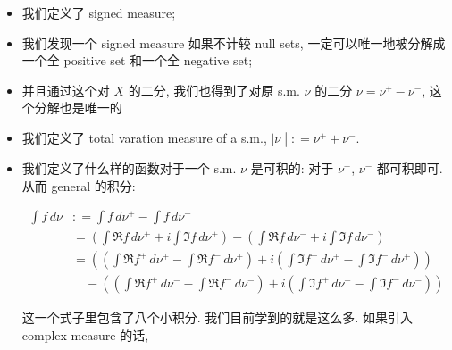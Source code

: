 \documentclass{qlnotes-export}
\begin{document}
\begin{itemize}
\item
  我们定义了 signed measure;
\item
  我们发现一个 signed measure 如果不计较 null sets, 一定可以唯一地被分解成一个全 positive set 和一个全 negative set;
\item
  并且通过这个对 \(X\) 的二分, 我们也得到了对原 s.m. \(\nu\) 的二分 \(\nu = \nu^{+} - \nu^{-}\), 这个分解也是唯一的
\item
  我们定义了 total varation measure of a s.m., \(\left. |\nu \middle| : = \nu^{+} + \nu^{-} \right.\).
\item
  我们定义了什么样的函数对于一个 s.m. \(\nu\) 是可积的: 对于 \(\nu^{+}\), \(\nu^{-}\) 都可积即可. 从而 general 的积分:

  \[\begin{matrix}
  {\int f\, d\nu} & {: = \int f\, d\nu^{+} - \int f\, d\nu^{-}} \\
   & {= (\int\Re f\, d\nu^{+} + i\int\Im f\, d\nu^{+}) - (\int\Re f\, d\nu^{-} + i\int\Im f\, d\nu^{-})} \\
   & {= ((\int\Re f^{+}\, d\nu^{+} - \int\Re f^{-}\, d\nu^{+}) + i(\int\Im f^{+}\, d\nu^{+} - \int\Im f^{-}\, d\nu^{+}))} \\
   & {\quad - ((\int\Re f^{+}\, d\nu^{-} - \int\Re f^{-}\, d\nu^{-}) + i(\int\Im f^{+}\, d\nu^{-} - \int\Im f^{-}\, d\nu^{-}))}
  \end{matrix}\]

  这一个式子里包含了八个小积分. 我们目前学到的就是这么多. 如果引入 complex measure 的话,
\end{itemize}
\end{document}
